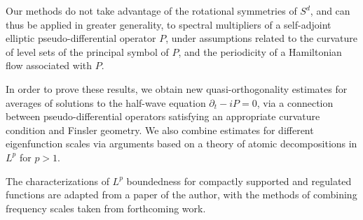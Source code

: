 %
% 
%


Our methods do not take advantage of the rotational symmetries of $S^d$, and can thus be applied in greater generality, to spectral multipliers of a self-adjoint elliptic pseudo-differential operator $P$, under assumptions related to the curvature of level sets of the principal symbol of $P$, and the periodicity of a Hamiltonian flow associated with $P$.

In order to prove these results, we obtain new quasi-orthogonality estimates for averages of solutions to the half-wave equation $\partial_t - i P = 0$, via a connection between pseudo-differential operators satisfying an appropriate curvature condition and Finsler geometry.  We also combine estimates for different eigenfunction scales via arguments based on a theory of atomic decompositions in $L^p$ for $p > 1$.

The characterizations of $L^p$ boundedness for compactly supported and regulated functions are adapted from a paper of the author, with the methods of combining frequency scales taken from forthcoming work.